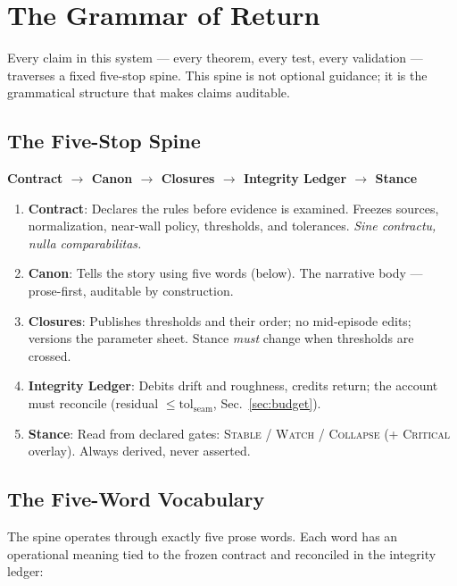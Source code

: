 \documentclass[
  aps,
  prd,
  preprint,
  superscriptaddress,
  nofootinbib,
  floatfix,
  longbibliography
]{revtex4-2}
\newcommand{\tolseam}{\mathrm{tol}_{\mathrm{seam}}}
\newcommand{\regime}[1]{\textrm{\upshape\scshape#1}}
\newcommand{\lat}[1]{\textit{#1}}
\begin{document}
\section{The Grammar of Return}\label{sec:grammar}

Every claim in this system — every theorem, every test,
every validation — traverses a fixed five-stop spine.
This spine is not optional guidance; it is the
grammatical structure that makes claims auditable.

\subsection{The Five-Stop Spine}

\begin{center}
\textbf{Contract $\to$ Canon $\to$ Closures $\to$
  Integrity Ledger $\to$ Stance}
\end{center}

\begin{enumerate}[nosep,leftmargin=*]
  \item \textbf{Contract}: Declares the rules before
    evidence is examined.
    Freezes sources, normalization, near-wall policy,
    thresholds, and tolerances.
    \lat{Sine contractu, nulla comparabilitas.}
  \item \textbf{Canon}: Tells the story using
    five words (below).
    The narrative body — prose-first, auditable by construction.
  \item \textbf{Closures}: Publishes thresholds and their
    order; no mid-episode edits; versions the parameter sheet.
    Stance \emph{must} change when thresholds are crossed.
  \item \textbf{Integrity Ledger}: Debits drift and roughness,
    credits return; the account must reconcile
    (residual $\leq \tolseam$, Sec.~\ref{sec:budget}).
  \item \textbf{Stance}: Read from declared gates:
    \regime{Stable} / \regime{Watch} / \regime{Collapse}
    (+ \regime{Critical} overlay).
    Always derived, never asserted.
\end{enumerate}

\subsection{The Five-Word Vocabulary}

The spine operates through exactly five prose words.
Each word has an operational meaning tied to the frozen
contract and reconciled in the integrity ledger:
\end{document}
